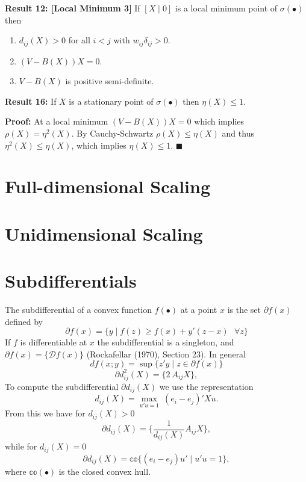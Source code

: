 \documentclass[12pt,]{article}
\providecommand{\tightlist}{%
  \setlength{\itemsep}{0pt}\setlength{\parskip}{0pt}}
\begin{document}
\textbf{Result 12: {[}Local Minimum 3{]}} If \([X\mid 0]\) is a local
minimum point of \(\sigma(\bullet)\) then

\begin{enumerate}
\def\labelenumi{\arabic{enumi}.}
\tightlist
\item
  \(d_{ij}(X)>0\) for all \(i<j\) with \(w_{ij}\delta_{ij}>0\).
\item
  \((V-B(X))X=0\).
\item
  \(V-B(X)\) is positive semi-definite.
\end{enumerate}

\textbf{Result 16: } If \(X\) is a stationary point of
\(\sigma(\bullet)\) then \(\eta(X)\leq 1\).

\textbf{Proof:} At a local minimum \((V-B(X))X=0\) which implies
\(\rho(X)=\eta^2(X)\). By Cauchy-Schwartz \(\rho(X)\leq\eta(X)\) and
thus \(\eta^2(X)\leq\eta(X)\), which implies \(\eta(X)\leq 1\).
\(\blacksquare\)

\hypertarget{full-dimensional-scaling}{%
\section{Full-dimensional Scaling}\label{full-dimensional-scaling}}

\hypertarget{unidimensional-scaling}{%
\section{Unidimensional Scaling}\label{unidimensional-scaling}}

\hypertarget{subdifferentials}{%
\section{Subdifferentials}\label{subdifferentials}}

The subdifferential of a convex function \(f(\bullet)\) at a point \(x\)
is the set \(\partial f(x)\) defined by \[
\partial f(x)=\{y\mid f(z)\geq f(x)+y'(z-x)\ \ \ \forall z\}
\] If \(f\) is differentiable at \(x\) the subdifferential is a
singleton, and \(\partial f(x)=\{\mathcal{D}f(x)\}\) (Rockafellar
(1970), Section 23). In general \[
df(x;y)=\sup\{z'y\mid  z\in\partial f(x)\}
\] \[
\partial d_{ij}^2(X)=\{2\ A_{ij}X\},
\] To compute the subdifferential \(\partial d_{ij}(X)\) we use the
representation \[
d_{ij}(X)=\max_{u'u=1}\ (e_i-e_j)'Xu.
\] From this we have for \(d_{ij}(X)>0\) \[
\partial d_{ij}(X)=\{\frac{1}{d_{ij}(X)}A_{ij}X\},
\] while for \(d_{ij}(X)=0\) \[
\partial d_{ij}(X)=\mathbb{co}\{(e_i-e_j)u'\mid u'u=1\},
\] where \(\mathbb{co}(\bullet)\) is the closed convex hull.
\end{document}
